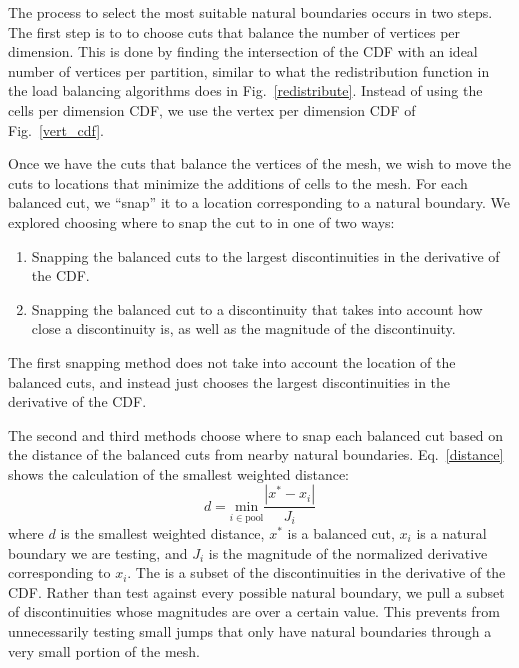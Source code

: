 \documentclass[times,final]{elsarticle}
\begin{document}
The process to select the most suitable natural boundaries occurs in two steps.
The first step is to to choose cuts that balance the number of vertices per dimension.
This is done by finding the intersection of the CDF with an ideal number of vertices per partition, similar to what the redistribution function in the load balancing algorithms does in Fig.~\ref{redistribute}.
Instead of using the cells per dimension CDF, we use the vertex per dimension CDF of Fig.~\ref{vert_cdf}.

Once we have the cuts that balance the vertices of the mesh, we wish to move the cuts to locations that minimize the additions of cells to the mesh.
For each balanced cut, we ``snap'' it to a location corresponding to a natural boundary.
We explored choosing where to snap the cut to in one of two ways:
\begin{enumerate}
  \item Snapping the balanced cuts to the largest discontinuities in the derivative of the CDF.
  \item Snapping the balanced cut to a discontinuity that takes into account how close a discontinuity is, as well as the magnitude of the discontinuity.
\end{enumerate}

The first snapping method does not take into account the location of the balanced cuts, and instead just chooses the largest discontinuities in the derivative of the CDF.

The second and third methods choose where to snap each balanced cut based on the distance of the balanced cuts from nearby natural boundaries. Eq.~\ref{distance} shows the calculation of the smallest weighted distance:
\begin{equation}
d = \underset{i \in \text{pool}}{\text{min}} \frac{|x^{*} - x_i|}{J_i}
\label{distance}
\end{equation}
where $d$ is the smallest weighted distance, $x^*$ is a balanced cut, $x_i$ is a natural boundary we are testing, and $J_i$ is the magnitude of the normalized derivative corresponding to $x_i$.
The  is a subset of the discontinuities in the derivative of the CDF.
Rather than test against every possible natural boundary, we pull a subset of discontinuities whose magnitudes are over a certain value.
This prevents from unnecessarily testing small jumps that only have natural boundaries through a very small portion of the mesh.

\FloatBarrier
\end{document}
